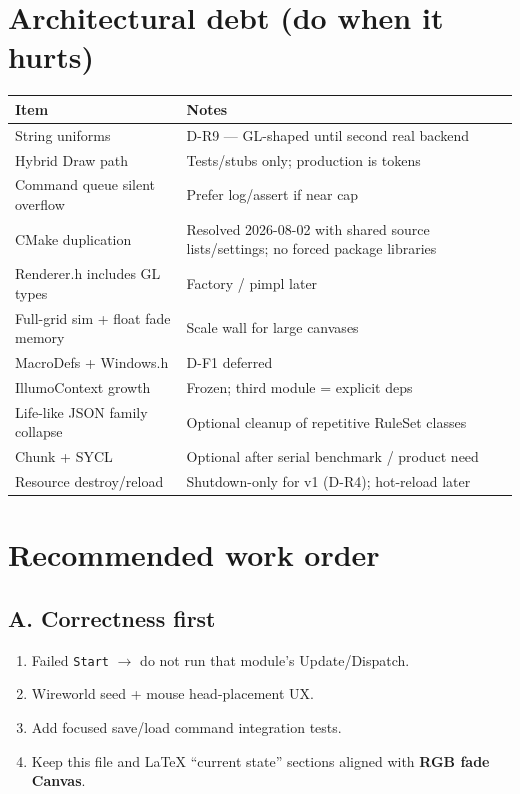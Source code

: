 \documentclass[10pt,a4paper]{article}
\begin{document}
\section{Architectural debt (do when it hurts)}
\begin{table}[h!]
\centering
\small
\begin{tabularx}{\textwidth}{l X}
\toprule
\textbf{Item} & \textbf{Notes} \\
\midrule
String uniforms & D-R9 --- GL-shaped until second real backend \\
Hybrid Draw path & Tests/stubs only; production is tokens \\
Command queue silent overflow & Prefer log/assert if near cap \\
CMake duplication & Resolved 2026-08-02 with shared source lists/settings; no forced package libraries \\
Renderer.h includes GL types & Factory / pimpl later \\
Full-grid sim + float fade memory & Scale wall for large canvases \\
MacroDefs + Windows.h & D-F1 deferred \\
IllumoContext growth & Frozen; third module = explicit deps \\
Life-like JSON family collapse & Optional cleanup of repetitive RuleSet classes \\
Chunk + SYCL & Optional after serial benchmark / product need \\
Resource destroy/reload & Shutdown-only for v1 (D-R4); hot-reload later \\
\bottomrule
\end{tabularx}
\end{table}

\section{Recommended work order}

\subsection{A. Correctness first}
\begin{enumerate}
    \item Failed \texttt{Start} $\rightarrow$ do not run that module's Update/Dispatch.
    \item Wireworld seed + mouse head-placement UX.
    \item Add focused save/load command integration tests.
    \item Keep this file and LaTeX ``current state'' sections aligned with \textbf{RGB fade Canvas}.
\end{enumerate}
\end{document}
